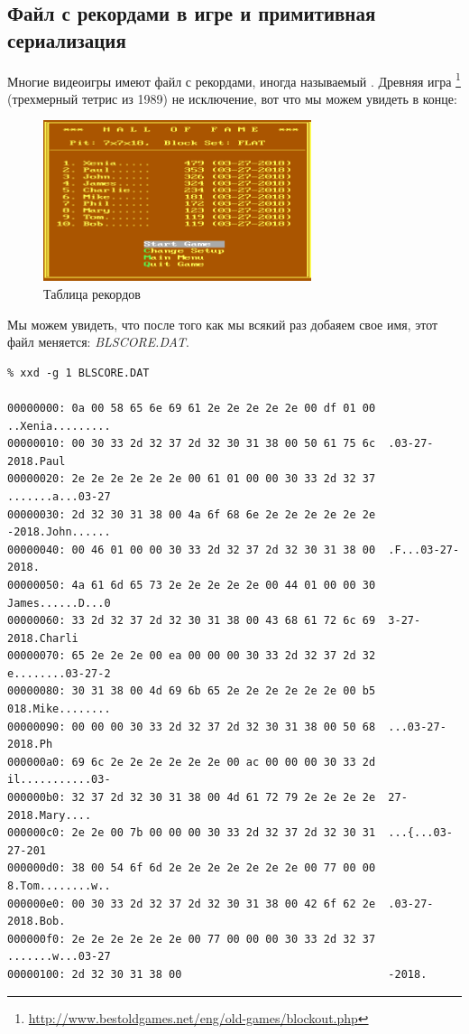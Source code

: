 \subsection{Файл с рекордами в игре  и примитивная сериализация}

Многие видеоигры имеют файл с рекордами, иногда называемый .
Древняя игра \footnote{\url{http://www.bestoldgames.net/eng/old-games/blockout.php}}
(трехмерный тетрис из 1989) не исключение, вот что мы можем увидеть в конце:

\begin{figure}[H]
\centering
\includegraphics[width=0.7\textwidth]{advanced/550_more_structs/blockout/hs.png}
\caption{Таблица рекордов}
\end{figure}

Мы можем увидеть, что после того как мы всякий раз добаяем свое имя, этот файл меняется: \emph{BLSCORE.DAT}.

\begin{lstlisting}
% xxd -g 1 BLSCORE.DAT

00000000: 0a 00 58 65 6e 69 61 2e 2e 2e 2e 2e 00 df 01 00  ..Xenia.........
00000010: 00 30 33 2d 32 37 2d 32 30 31 38 00 50 61 75 6c  .03-27-2018.Paul
00000020: 2e 2e 2e 2e 2e 2e 00 61 01 00 00 30 33 2d 32 37  .......a...03-27
00000030: 2d 32 30 31 38 00 4a 6f 68 6e 2e 2e 2e 2e 2e 2e  -2018.John......
00000040: 00 46 01 00 00 30 33 2d 32 37 2d 32 30 31 38 00  .F...03-27-2018.
00000050: 4a 61 6d 65 73 2e 2e 2e 2e 2e 00 44 01 00 00 30  James......D...0
00000060: 33 2d 32 37 2d 32 30 31 38 00 43 68 61 72 6c 69  3-27-2018.Charli
00000070: 65 2e 2e 2e 00 ea 00 00 00 30 33 2d 32 37 2d 32  e........03-27-2
00000080: 30 31 38 00 4d 69 6b 65 2e 2e 2e 2e 2e 2e 00 b5  018.Mike........
00000090: 00 00 00 30 33 2d 32 37 2d 32 30 31 38 00 50 68  ...03-27-2018.Ph
000000a0: 69 6c 2e 2e 2e 2e 2e 2e 00 ac 00 00 00 30 33 2d  il...........03-
000000b0: 32 37 2d 32 30 31 38 00 4d 61 72 79 2e 2e 2e 2e  27-2018.Mary....
000000c0: 2e 2e 00 7b 00 00 00 30 33 2d 32 37 2d 32 30 31  ...{...03-27-201
000000d0: 38 00 54 6f 6d 2e 2e 2e 2e 2e 2e 2e 00 77 00 00  8.Tom........w..
000000e0: 00 30 33 2d 32 37 2d 32 30 31 38 00 42 6f 62 2e  .03-27-2018.Bob.
000000f0: 2e 2e 2e 2e 2e 2e 00 77 00 00 00 30 33 2d 32 37  .......w...03-27
00000100: 2d 32 30 31 38 00                                -2018.
\end{lstlisting}


